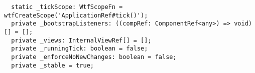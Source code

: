 \begin{verbatim}
  static _tickScope: WtfScopeFn = wtfCreateScope('ApplicationRef#tick()');
  private _bootstrapListeners: ((compRef: ComponentRef<any>) => void)[] = [];
  private _views: InternalViewRef[] = [];
  private _runningTick: boolean = false;
  private _enforceNoNewChanges: boolean = false;
  private _stable = true;
\end{verbatim}
